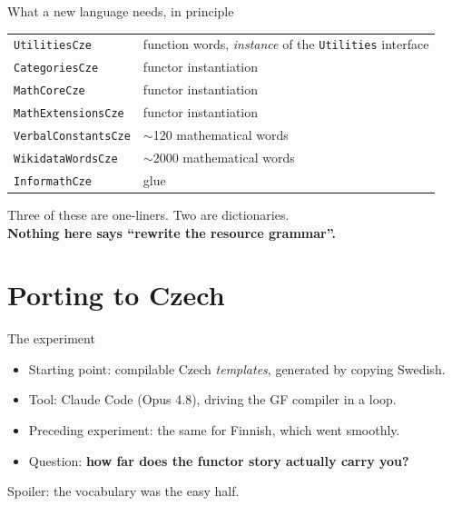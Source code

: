 \documentclass[10pt,aspectratio=169]{beamer}
\begin{document}
\begin{frame}{What a new language needs, in principle}
  \begin{center}
  \begin{tabular}{ll}
    \toprule
    \texttt{UtilitiesCze} & function words, \emph{instance} of the \texttt{Utilities} interface \\
    \texttt{CategoriesCze} & functor instantiation \\
    \texttt{MathCoreCze} & functor instantiation \\
    \texttt{MathExtensionsCze} & functor instantiation \\
    \texttt{VerbalConstantsCze} & $\sim$120 mathematical words \\
    \texttt{WikidataWordsCze} & $\sim$2000 mathematical words \\
    \texttt{InformathCze} & glue \\
    \bottomrule
  \end{tabular}
  \end{center}

  \vspace{1em}
  Three of these are one-liners. Two are dictionaries. \\
  \textbf{Nothing here says ``rewrite the resource grammar''.}
\end{frame}

\section{Porting to Czech}

\begin{frame}{The experiment}
  \begin{itemize}
    \item Starting point: compilable Czech \emph{templates}, generated by copying Swedish.
    \item Tool: Claude Code (Opus 4.8), driving the GF compiler in a loop.
    \item Preceding experiment: the same for Finnish, which went smoothly.
    \item Question: \textbf{how far does the functor story actually carry you?}
  \end{itemize}

  \vspace{1em}
  Spoiler: the vocabulary was the easy half.
\end{frame}
\end{document}

